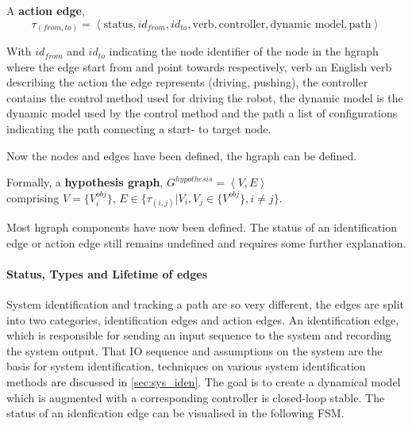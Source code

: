A \textbf{action edge}, \[\tau_{(from, to)} = \left\langle \textrm{status}, id_{from}, id_{to}, \textrm{verb}, \textrm{controller},\textrm{dynamic model}, \textrm{path}\right\rangle\]\bs

With $id_{from}$ and $id_{to}$ indicating the node identifier of the node in the \ac{hgraph} where the edge start from and point towards respectively, verb an English verb describing the action the edge represents (driving, pushing), the controller contains the control method used for driving the robot, the dynamic model is the dynamic model used by the control method and the path a list of configurations indicating the path connecting a start- to target node.\bs

Now the nodes and edges have been defined, the \ac{hgraph} can be defined.\bs

Formally, a \textbf{hypothesis graph}, $G^{hypothesis} = \left\langle V, E \right\rangle $
\\comprising $V = \{V^{obj}_{i}\}$, \quad $E \in \{\tau_{(i,j)}| V_i, V_j \in \{V^{obj} \}, i \neq j\}$.\bs

Most \ac{hgraph} components have now been defined. The status of an identification edge or action edge still remains undefined and requires some further explanation.\bs

\paragraph{Status, Types and Lifetime of edges}
System identification and tracking a path are so very different, the edges are split into two categories, identification edges and action edges. An identification edge, which is responsible for sending an input sequence to the system and recording the system output. That \ac{IO} sequence and assumptions on the system are the basis for system identification, techniques on various system identification methods are discussed in \cref{sec:sys_iden}. The goal is to create a dynamical model which is augmented with a corresponding controller is closed-loop stable. The status of an idenfication edge can be visualised in the following \ac{FSM}.\bs

